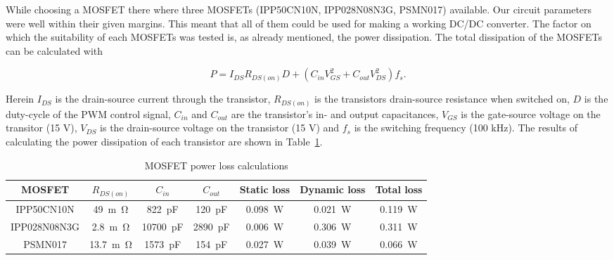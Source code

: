 \documentclass[11pt,titlepage]{report}
\begin{document}
While choosing a MOSFET	there where three MOSFETs (IPP50CN10N, IPP028N08N3G, PSMN017) available. Our circuit parameters were well within their given margins. This meant that all of them could be used for making a working DC/DC converter. The factor on which the suitability of each MOSFETs was tested is, as already mentioned, the power dissipation. The total dissipation of the MOSFETs can be calculated with

\begin{equation}
P = I_{DS}R_{DS(on)}D +	(C_{in}V_{GS}^2 + C_{out}V_{DS}^2)f_{s}.
\end{equation}

Herein $I_{DS}$ is the drain-source current through the transistor, $R_{DS(on)}$ is the transistors drain-source resistance when switched on, $D$ is the duty-cycle of the PWM control signal, $C_{in}$ and $C_{out}$ are the transistor’s in- and output capacitances, $V_{GS}$ is the gate-source voltage on the
transitor (15 V), $V_{DS}$ is the drain-source voltage on the transistor (15 V) and $f_{s}$ is the switching frequency (100 kHz).  The results of calculating the power dissipation of each transistor are shown in Table~\ref{tab:ass2-powerloss}. 

\begin{table}[H]
	\centering
	\begin{tabular}{c c c c c c c}
		\hline\hline
		MOSFET & $R_{DS(on)}$ & $C_{in}$ & $C_{out}$ & Static loss & Dynamic loss & Total loss \\
		\hline
		IPP50CN10N & \SI{49}{m\ohm} & \SI{822}{pF} & \SI{120}{pF} & \SI{0.098}{W} & \SI{0.021}{W} & \SI{0.119}{W} \\
		IPP028N08N3G & \SI{2.8}{m\ohm} & \SI{10700}{pF} & \SI{2890}{pF} & \SI{0.006}{W} & \SI{0.306}{W} & \SI{0.311}{W} \\
		PSMN017 & \SI{13.7}{m\ohm} & \SI{1573}{pF} & \SI{154}{pF} & \SI{0.027}{W} & \SI{0.039}{W} & \SI{0.066}{W} \\
		\hline
		\end{tabular}
		\caption{MOSFET power loss calculations}
	    \label{tab:ass2-powerloss}
\end{table}
\end{document}
